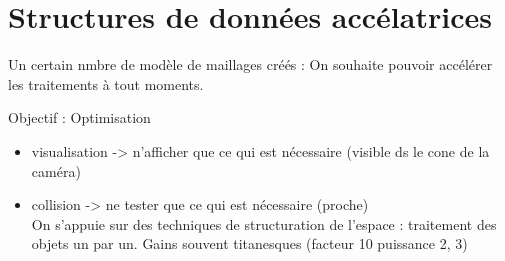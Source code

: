\documentclass[11pt]{article}
\begin{document}
{\section{Structures de données accélatrices}
Un certain nmbre de modèle de maillages créés : On souhaite pouvoir accélérer les traitements à tout moments.

Objectif : Optimisation
\begin{itemize}
	\item visualisation -> n'afficher que ce qui est nécessaire (visible ds le cone de la caméra)
	\item collision -> ne tester que ce qui est nécessaire (proche)\\
		On s'appuie sur des techniques de structuration de l'espace : traitement des objets un par un. Gains souvent titanesques (facteur 10 puissance 2, 3)
\end{itemize}

}
\end{document}
